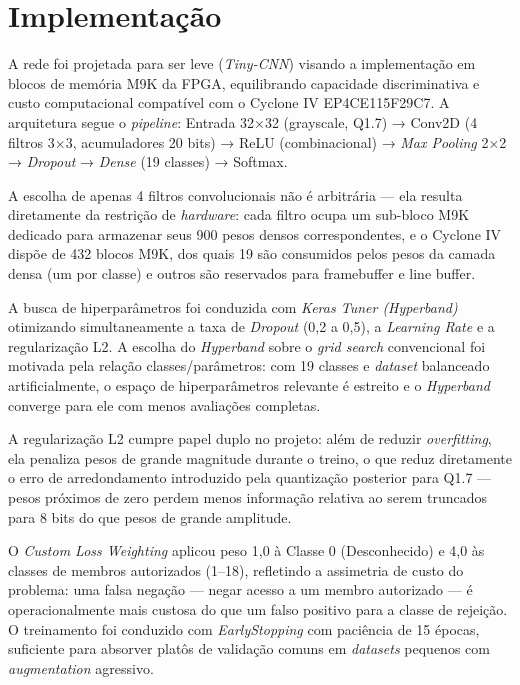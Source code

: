 \section{Implementação}
A rede foi projetada para ser leve (\textit{Tiny-CNN}) visando a implementação em blocos de memória M9K da FPGA, equilibrando capacidade discriminativa e custo computacional compatível com o Cyclone IV EP4CE115F29C7.
A arquitetura segue o \textit{pipeline}: Entrada 32×32 (grayscale, Q1.7) → Conv2D (4 filtros 3×3, acumuladores 20 bits) → ReLU (combinacional) → \textit{Max Pooling} 2×2 → \textit{Dropout} → \textit{Dense} (19 classes) → Softmax. 

A escolha de apenas 4 filtros convolucionais não é arbitrária — ela resulta diretamente da restrição de \textit{hardware}: cada filtro ocupa um sub-bloco M9K dedicado para armazenar seus 900 pesos densos correspondentes, e o Cyclone IV dispõe de 432 blocos M9K, dos quais 19 são consumidos pelos pesos da camada densa (um por classe) e outros são reservados para framebuffer e line buffer.

A busca de hiperparâmetros foi conduzida com \textit{Keras Tuner (Hyperband)} otimizando simultaneamente a taxa de \textit{Dropout} (0,2 a 0,5), a \textit{Learning Rate} e a regularização L2. A escolha do \textit{Hyperband} sobre o \textit{grid search} convencional foi motivada pela relação classes/parâmetros: com 19 classes e \textit{dataset} balanceado artificialmente, o espaço de hiperparâmetros relevante é estreito e o \textit{Hyperband} converge para ele com menos avaliações completas.

A regularização L2 cumpre papel duplo no projeto: além de reduzir \textit{overfitting}, ela penaliza pesos de grande magnitude durante o treino, o que reduz diretamente o erro de arredondamento introduzido pela quantização posterior para Q1.7 — pesos próximos de zero perdem menos informação relativa ao serem truncados para 8 bits do que pesos de grande amplitude.

O \textit{Custom Loss Weighting} aplicou peso 1,0 à Classe 0 (Desconhecido) e 4,0 às classes de membros autorizados (1–18), refletindo a assimetria de custo do problema: uma falsa negação — negar acesso a um membro autorizado — é operacionalmente mais custosa do que um falso positivo para a classe de rejeição. O treinamento foi conduzido com \textit{EarlyStopping} com paciência de 15 épocas, suficiente para absorver platôs de validação comuns em \textit{datasets} pequenos com \textit{augmentation} agressivo.

